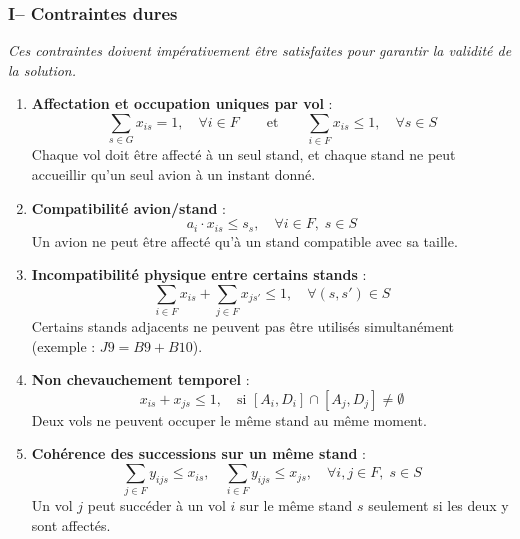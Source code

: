 \subsubsection*{I– Contraintes dures}
\textit{Ces contraintes doivent impérativement être satisfaites pour garantir la validité de la solution.}
\begin{enumerate}
	
	\item \textbf{Affectation et occupation uniques par vol} :
	\vspace{-0.7em}
	\begin{equation}
		\sum_{s \in G} x_{is} = 1,\quad \forall i \in F \qquad \text{et} \qquad \sum_{i \in F} x_{is} \leq 1,\quad \forall s \in S
	\end{equation}
	Chaque vol doit être affecté à un seul stand, et chaque stand ne peut accueillir qu’un seul avion à un instant donné.
	
	\item \textbf{Compatibilité avion/stand} :
			\vspace{-0.7em}     
	\begin{equation}  
		a_i \cdot x_{is}  \leq s_s , \quad \forall i \in F,\; s \in S
	\end{equation}
	Un avion ne peut être affecté qu’à un stand compatible avec sa taille.
	
	\item \textbf{Incompatibilité physique entre certains stands} :
	\vspace{-0.7em}
	\begin{equation}
		\sum_{i \in F} x_{is} + \sum_{j \in F} x_{js'} \leq 1, \quad \forall (s, s') \in S
	\end{equation}
	Certains stands adjacents ne peuvent pas être utilisés simultanément (exemple : $J9 = B9 + B10$).
	
	\item \textbf{Non chevauchement temporel} :
			\vspace{-0.7em}     
	\begin{equation}
		x_{is} + x_{js} \leq 1, \quad \text{si } [A_i, D_i] \cap [A_j, D_j] \neq \emptyset
	\end{equation}
	Deux vols ne peuvent occuper le même stand au même moment.
	
	\item \textbf{Cohérence des successions sur un même stand} :
	\vspace{-0.7em}
	\begin{equation}
		\sum_{j \in F} y_{ijs} \leq x_{is}, \quad 
		\sum_{i \in F} y_{ijs} \leq x_{js}, \quad 
		\forall i, j \in F,\; s \in S
	\end{equation}
	Un vol $j$ peut succéder à un vol $i$ sur le même stand $s$ seulement si les deux y sont affectés.
	

\end{enumerate}
